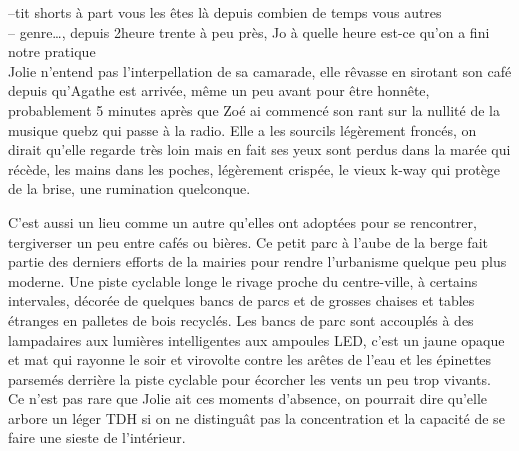 \documentclass{article}
\begin{document}
--tit shorts à part vous les êtes là depuis combien de temps vous
autres\\
-- genre\ldots, depuis 2heure trente à peu près, Jo à quelle
heure est-ce qu'on a fini notre pratique\\

Jolie n'entend pas l'interpellation de sa camarade, elle rêvasse en sirotant
son café depuis qu'Agathe est arrivée, même un peu avant pour être honnête,
probablement 5 minutes après que Zoé ai commencé son rant sur la nullité
de la musique quebz qui passe à la radio. Elle a les sourcils légèrement
froncés, on dirait qu'elle regarde très loin mais en fait ses yeux sont perdus
dans la marée qui récède, les mains dans les poches, légèrement crispée, le
vieux k-way qui protège de la brise, une rumination quelconque.



C'est aussi un lieu comme un autre qu'elles ont adoptées pour se rencontrer,
tergiverser un peu entre cafés ou bières. Ce petit parc à l'aube de la berge
fait partie des derniers efforts de la mairies pour rendre l'urbanisme quelque
peu plus moderne. Une piste cyclable longe le rivage proche du
centre-ville, à certains intervales, décorée de quelques bancs de parcs et
de grosses chaises et tables étranges en palletes de bois recyclés. Les bancs
de parc sont accouplés à des lampadaires aux lumières intelligentes aux ampoules
LED, c'est un jaune opaque et mat qui rayonne le soir et virovolte contre les
arêtes de l'eau et les épinettes parsemés derrière la piste cyclable pour
écorcher les vents un peu trop vivants. \\

Ce n'est pas rare que Jolie ait ces moments d'absence, on pourrait dire qu'elle
arbore un léger TDH si on ne distinguât pas la concentration et la capacité
de se faire une sieste de l'intérieur.
\end{document}
